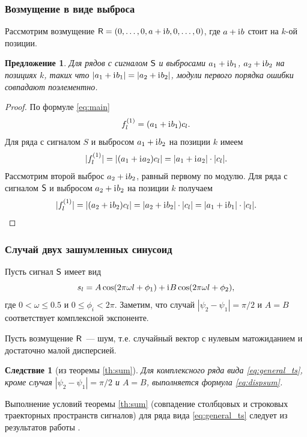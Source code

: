 \documentclass[12pt,a4paper]{article}
\newtheorem{proposition}{Предложение}%
\newtheorem{corollary}{Следствие}%
\begin{document}
\subsubsection{Возмущение в виде выброса}

Рассмотрим возмущение $\textsf{R} = (0, \ldots, 0, a + \mathrm{i}\mkern1mu b, 0, \ldots, 0)$, где $a + \mathrm{i}\mkern1mu b$ стоит на $k$-ой позиции.

\begin{proposition}\label{st:RMSEinv}
	Для рядов с сигналом $\textsf{S}$ и выбросами $a_1 + \mathrm{i}\mkern1mu b_1$, $a_2 + \mathrm{i}\mkern1mu b_2$ на позициях $k$, таких что $|a_1 + \mathrm{i}\mkern1mu b_1| = |a_2 + \mathrm{i}\mkern1mu b_2|$, модули первого порядка ошибки совпадают поэлементно.
\end{proposition}
\begin{proof}
	По формуле \eqref{eq:main}
	$$f^{(1)}_l = (a_1 + \mathrm{i}\mkern1mu b_1)c_l.$$
	Для ряда с сигналом $S$ и выбросом $a_1 + \mathrm{i}\mkern1mu b_2$ на позиции $k$ имеем
	$$|f^{(1)}_l| = |(a_1 + \mathrm{i}\mkern1mu a_2)c_l| = |a_1 + \mathrm{i}\mkern1mu a_2|\cdot|c_l|. $$
	Рассмотрим второй выброс $a_2 + \mathrm{i}\mkern1mu b_2$, равный первому по модулю.
	Для ряда с сигналом $\textsf{S}$ и выбросом $a_2 + \mathrm{i}\mkern1mu b_2$ на позиции $k$ получаем
	$$|f^{(1)}_l| = |(a_2 + \mathrm{i}\mkern1mu b_2)c_l| = |a_2 + \mathrm{i}\mkern1mu b_2|\cdot|c_l| = |a_1 + \mathrm{i}\mkern1mu b_1|\cdot|c_l|. $$
\end{proof}


\subsubsection{Случай двух зашумленных синусоид}
Пусть сигнал $\textsf{S}$ имеет вид
\begin{equation}
\label{eq:general_ts}
s_l = A\cos(2 \pi\omega l + \phi_1) + \mathrm{i}\mkern1mu B\cos(2 \pi\omega l + \phi_2),
\end{equation}
где $0<\omega\le 0.5$ и $0\le\phi_i < 2\pi$.
Заметим, что случай $|\psi_2-\psi_1| = \pi/2$ и $A=B$ соответствует комплексной экспоненте.

Пусть возмущение $\textsf{R}$~--- шум, т.е. случайный вектор с нулевым матожиданием и достаточно малой дисперсией.

\begin{corollary}[из теоремы {\ref{th:sum}}]
Для комплексного ряда вида \eqref{eq:general_ts}, кроме случая $|\psi_2-\psi_1| = \pi/2$ и $A=B$,  выполняется формула \eqref{eq:dispsum}.
\end{corollary}
Выполнение условий теоремы {\ref{th:sum}} (совпадение столбцовых и строковых траекторных пространств сигналов) для ряда вида \eqref{eq:general_ts} следует из результатов работы \cite{Golyandina.Stepanov2005}.
\end{document}
